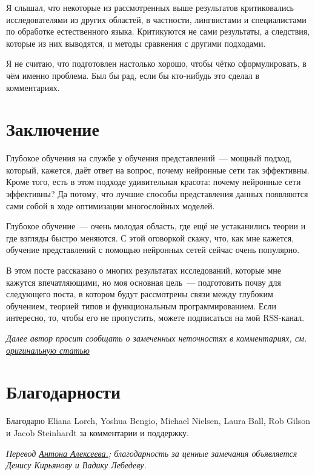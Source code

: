 \documentclass[a4paper,12pt]{article}
\begin{document}
Я слышал, что некоторые из рассмотренных выше результатов критиковались исследователями из других областей, в частности, лингвистами и специалистами по обработке естественного языка. Критикуются не сами результаты, а следствия, которые из них выводятся, и методы сравнения с другими подходами.

Я не считаю, что подготовлен настолько хорошо, чтобы чётко сформулировать, в чём именно проблема. Был бы рад, если бы кто-нибудь это сделал в комментариях.

\section*{Заключение}

Глубокое обучения на службе у обучения представлений~--- мощный подход, который, кажется, даёт ответ на вопрос, почему нейронные сети так эффективны. Кроме того, есть в этом подходе удивительная красота: почему нейронные сети эффективны? Да потому, что лучшие способы представления данных появляются сами собой в ходе оптимизации многослойных моделей.

Глубокое обучение~--- очень молодая область, где ещё не устаканились теории и где взгляды быстро меняются. С этой оговоркой скажу, что, как мне кажется, обучение представлений с помощью нейронных сетей сейчас очень популярно.

В этом посте рассказано о многих результатах исследований, которые мне кажутся впечатляющими, но моя основная цель~--- подготовить почву для следующего поста, в котором будут рассмотрены связи между глубоким обучением, теорией типов и функциональным программированием. Если интересно, то, чтобы его не пропустить, можете подписаться на мой RSS-канал.
 
{\it Далее автор просит сообщать о замеченных неточностях в комментариях, см. \href{http://colah.github.io/posts/2014-07-NLP-RNNs-Representations/}{оригинальную статью}} 
 
\section*{Благодарности}

Благодарю Eliana Lorch, Yoshua Bengio, Michael Nielsen, Laura Ball, Rob Gilson и Jacob Steinhardt за комментарии и поддержку.

\bigskip

{\it Перевод \href{http://www.stachek66.ru}{Антона Алексеева.}; благодарность за ценные замечания объявляется Денису Кирьянову и Вадику Лебедеву.}

\end{document}

